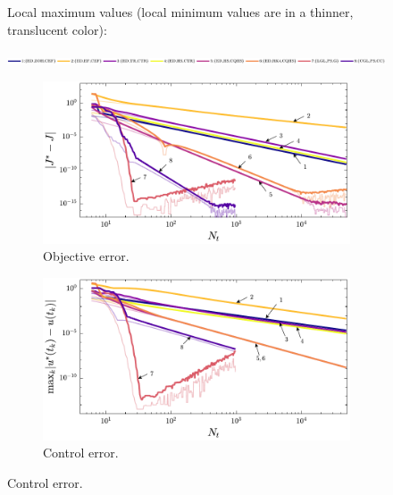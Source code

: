 \begin{figure}%
\centering

{\footnotesize Local maximum values (local minimum values are in a thinner, translucent color):}

\includegraphics[width=\textwidth]{../ch5/figures/ex1_sens_legend}%

\vspace{1mm}

\begin{subfigure}{0.5\textwidth}
\centering
\includegraphics[width=\textwidth]{../ch5/figures/ex1_sens_objective}%
\caption{Objective error.}
\label{fig:ch5:ex1sens:objective}
\end{subfigure}%
\begin{subfigure}{0.5\textwidth}
\centering
\includegraphics[width=\textwidth]{../ch5/figures/ex1_sens_control}%
\caption{Control error.}
\label{fig:ch5:ex1sens:control}
\end{subfigure}%


\end{figure}
